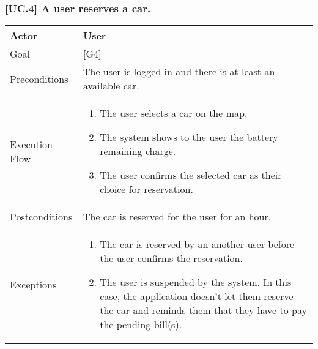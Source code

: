 \documentclass[english]{article}
\begin{document}
	\subsubsection{[UC.4] A user reserves a car.}
	\begin{tabularx}{\textwidth}{  l  X  }
		\hline
		Actor & User\\
		\hline
		Goal & [G4]\\
		\hline
		Preconditions & The user is logged in and there is at least an available car.\\
		\hline
		Execution Flow & \begin{enumerate}
			\item{The user selects a car on the map.}
			\item{The system shows to the user the battery remaining charge.}
			\item{The user confirms the selected car as their choice for reservation.}
		\end{enumerate}\\
		\hline
		Postconditions & The car is reserved for the user for an hour. \\
		\hline
		Exceptions & \begin{enumerate}
			\item{The car is reserved by an another user before the user confirms the reservation.}
			\item{The user is suspended by the system. In this case, the application doesn't let them reserve the car and reminds them that they have to pay the pending bill(s).}
		\end{enumerate}\\
		\hline
	\end{tabularx}
	
\end{document}

